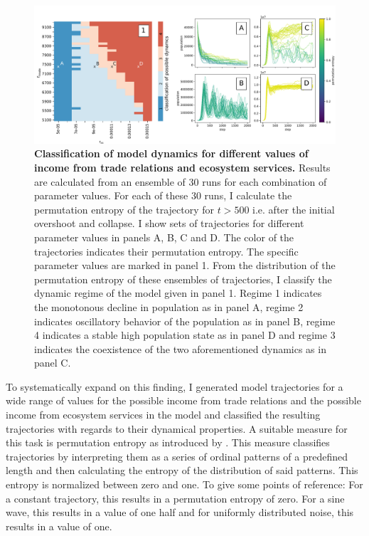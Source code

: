 \begin{figure}[!t]
\centering
\includegraphics[width=\textwidth]{figures/classified_dynamics.pdf}
\caption{\textbf{Classification of model dynamics for different values of income from trade relations and ecosystem services.} Results are calculated from an ensemble of 30 runs for each combination of parameter values. For each of these 30 runs, I calculate the permutation entropy of the trajectory for $t>500$ i.e. after the initial overshoot and collapse. I show sets of trajectories for different parameter values in panels A, B, C and D. The color of the trajectories indicates their permutation entropy. The specific parameter values are marked in panel 1. From the distribution of the permutation entropy of these ensembles of trajectories, I classify the dynamic regime of the model given in panel 1. Regime 1 indicates the monotonous decline in population as in panel A, regime 2 indicates oscillatory behavior of the population as in panel B, regime 4 indicates a stable high population state as in panel D and regime 3 indicates the coexistence of the two aforementioned dynamics as in panel C.}
\label{fig:permutation_entropy}
\end{figure}


To systematically expand on this finding, I generated model trajectories for a wide range of values
for the possible income from trade relations and the possible income from ecosystem services in the model and classified the resulting trajectories with regards to their dynamical properties. A suitable measure for this task is permutation entropy as introduced by \cite{Bandt2002}. This measure classifies trajectories by interpreting them as a series of ordinal patterns of a predefined length and then calculating the entropy of the distribution of said patterns. This entropy is normalized between zero and one. To give some points of reference: For a constant trajectory, this results in a permutation entropy of zero. For a sine wave, this results in a value of one half and for uniformly distributed noise, this results in a value of one.

